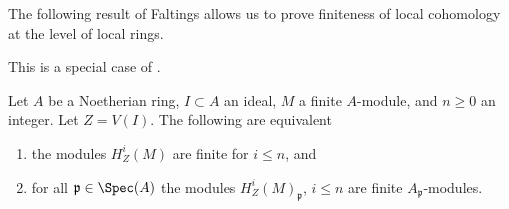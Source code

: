 \noindent
The following result of Faltings allows us to prove finiteness
of local cohomology at the level of local rings.

\begin{lemma}
\label{lemma-check-finiteness-local-cohomology-locally}
\begin{reference}
This is a special case of \cite[Satz 1]{Faltings-finiteness}.
\end{reference}
Let $A$ be a Noetherian ring, $I \subset A$ an ideal, $M$ a finite
$A$-module, and $n \geq 0$ an integer. Let $Z = V(I)$.
The following are equivalent
\begin{enumerate}
\item the modules $H^i_Z(M)$ are finite for $i \leq n$, and
\item for all $\mathfrak p \in \Spec(A)$ the modules
$H^i_Z(M)_\mathfrak p$, $i \leq n$ are finite $A_\mathfrak p$-modules.
\end{enumerate}
\end{lemma}

